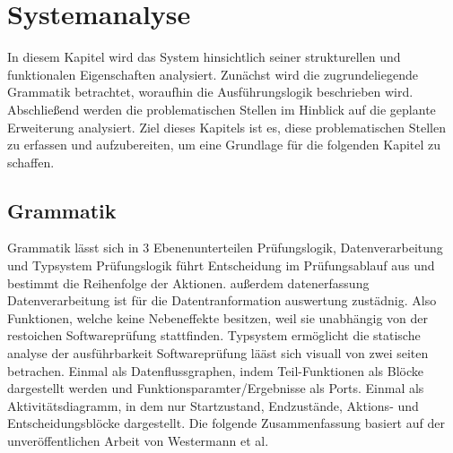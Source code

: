 \documentclass{article}
\begin{document}
    \section{Systemanalyse}
    In diesem Kapitel wird das System hinsichtlich seiner strukturellen und funktionalen Eigenschaften analysiert. 
    Zunächst wird die zugrundeliegende Grammatik betrachtet, woraufhin die Ausführungslogik beschrieben wird. Abschließend werden die problematischen Stellen im Hinblick auf die geplante Erweiterung analysiert.
    Ziel dieses Kapitels ist es, diese problematischen Stellen zu erfassen und aufzubereiten, um eine Grundlage für die folgenden Kapitel zu schaffen.\\
    \subsection{Grammatik}
    \label{BNF}
    Grammatik lässt sich in 3 Ebenenunterteilen Prüfungslogik, Datenverarbeitung und Typsystem
    Prüfungslogik führt Entscheidung im Prüfungsablauf aus und bestimmt die Reihenfolge der Aktionen. außerdem datenerfassung
    Datenverarbeitung ist für die Datentranformation auswertung zustädnig. Also Funktionen, welche keine Nebeneffekte besitzen, weil sie unabhängig von der restoichen Softwareprüfung stattfinden.
    Typsystem ermöglicht die statische analyse der ausführbarkeit
    Softwareprüfung lääst sich visuall von zwei seiten betrachen. 
    Einmal als Datenflussgraphen, indem Teil-Funktionen als Blöcke dargestellt werden und Funktionsparamter/Ergebnisse als Ports.
    Einmal als Aktivitätsdiagramm, in dem nur Startzustand, Endzustände, Aktions- und Entscheidungsblöcke dargestellt.
    Die folgende Zusammenfassung basiert auf der unveröffentlichen Arbeit von Westermann et al.
    
\end{document}
